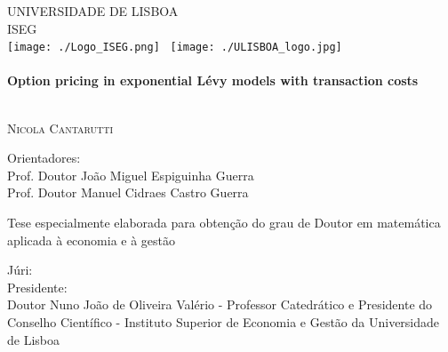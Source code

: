 \begin{titlepage}
\begin{center}



\textsc{\Large UNIVERSIDADE DE LISBOA}\\[0.25cm]
\textsc{\Large ISEG}\\[0.7cm]

\texttt{[image: ./Logo\_ISEG.png]}~
\texttt{[image: ./ULISBOA\_logo.jpg]}~ \\[0.2cm]

\HRule \\[0.4cm]
{ \huge \bfseries Option pricing in exponential Lévy models with transaction costs \\[0.2em] }

\HRule \\[1.5cm]


\textsc{\LARGE Nicola Cantarutti}\\[0.5em]


\noindent
\begin{flushleft}
Orientadores:\\[0.15cm]
   Prof. Doutor João Miguel Espiguinha Guerra\\
   Prof. Doutor Manuel Cidraes Castro Guerra\\
\end{flushleft}
\vspace{1.0em}


{Tese especialmente elaborada para obtenção do grau de Doutor em matemática aplicada à economia e à gestão}\\[1em]

\noindent
\begin{flushleft} \footnotesize
Júri:\\[0.1cm]
Presidente:\\
Doutor Nuno João de Oliveira Valério -
Professor Catedrático e Presidente do Conselho Científico - Instituto Superior de Economia e Gestão da Universidade de Lisboa
\\[0.1cm]


\end{flushleft}
\end{center}
\end{titlepage}
